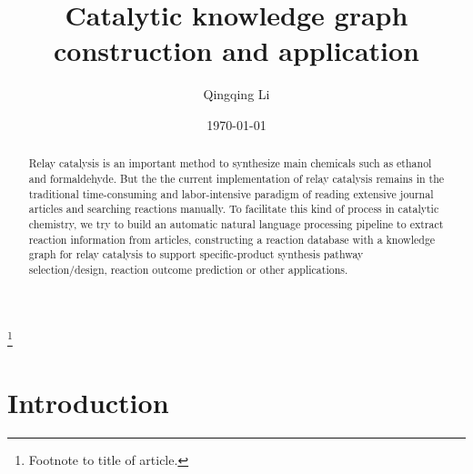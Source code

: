 \documentclass[%
 aip,
 jmp,%
 amsmath,amssymb,
 reprint,%
]{revtex4-2}
\begin{document}

\title[Catalytic knowledge graph construction and application]{Catalytic knowledge graph construction and application}%
\thanks{Footnote to title of article.}

\author{Qingqing Li}

\date{\today}%

\begin{abstract}
    
Relay catalysis is an important method to synthesize main chemicals such as ethanol and formaldehyde. But the 
the current implementation of relay catalysis remains in the traditional time-consuming 
and labor-intensive paradigm of reading extensive journal articles and searching reactions manually. 
To facilitate this kind of process in catalytic chemistry, we try to build an automatic natural 
language processing pipeline to extract reaction information from articles, constructing a reaction 
database with a knowledge graph for relay catalysis to support specific-product 
synthesis pathway selection/design, reaction outcome prediction or other applications.
\end{abstract}

\maketitle



\section{Introduction}
\end{document}
